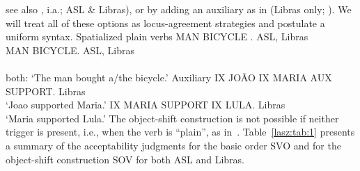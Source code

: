 \documentclass[output=paper]{langscibook}
\begin{document}
see also \citealp{Bergman.1980,Liddell.1980,Costello.2015,Smith.1990}, i.a.; ASL \& Libras),
or by adding an auxiliary as in  (Libras only; \citealp{Quadros.1999}). We
will treat all of these options as locus-agreement strategies and
postulate a uniform syntax.
\ea 
    \label{lasz:ex:5}
    Spatialized plain verbs
    \ea 
        MAN BICYCLE . 
        \hfill 
        \cmark ASL, \cmark Libras \\ 
        \citep[from][9]{Quadros.etal.2004}
    \ex 
        MAN  BICYCLE. 
        \hfill 
        \cmark ASL, \cmark Libras \\ 
        \citep[from][9]{Quadros.etal.2004} \\ 
        both: `The man bought a/the bicycle.'
    \z 
\ex 
    \label{lasz:ex:6}
    Auxiliary 
    \ea 
        IX JOÃO IX MARIA AUX SUPPORT. 
        \hfill 
        \cmark Libras 
        \\ 
        `Joao supported Maria.'
        \citep[from][7]{Quadros.etal.2004} 
    \ex 
        IX MARIA SUPPORT IX LULA. 
        \hfill 
        \cmark Libras 
        \\ 
        `Maria supported Lula.' 
        \citep[from][5]{Quadros.etal.2004}
    \z 
\z 
The object-shift construction is not possible if neither trigger is
present, i.e., when the verb is ``plain'', as in~.
\ea 
    \label{lasz:ex:7}
    \z 
\z 
Table~\ref{lasz:tab:1} presents a summary of the acceptability judgments for the
basic order SVO and for the object-shift construction SOV for both
ASL and Libras.
\end{document}
